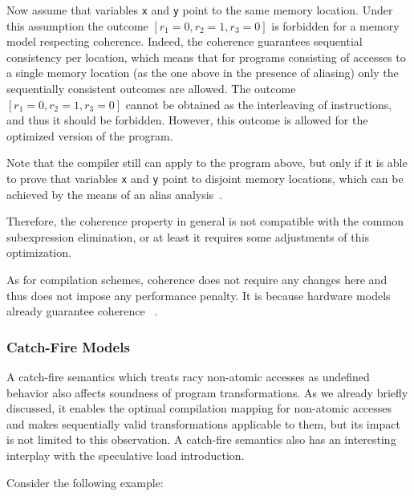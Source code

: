 Now assume that variables \texttt{x} and \texttt{y} 
point to the same memory location.
Under this assumption the outcome $[r_1=0, r_2=1, r_3=0]$
is forbidden for a memory model respecting coherence.
Indeed, the coherence guarantees sequential consistency per location, 
which means that for programs consisting of accesses 
to a single memory location 
(as the one above in the presence of aliasing) 
only the sequentially consistent outcomes are allowed.
The outcome $[r_1=0, r_2=1, r_3=0]$ cannot be obtained 
as the interleaving of instructions, and thus 
it should be forbidden.  
However, this outcome is allowed for 
the optimized version of the program. 

Note that the compiler still can apply \CSE to the program above, 
but only if it is able to prove that variables \texttt{x} and \texttt{y} 
point to disjoint memory locations, which can be achieved 
by the means of an alias analysis~\cite{Diwan-al:PLDI1998}.  

Therefore, the coherence property in general is not compatible 
with the common subexpression elimination, or at least 
it requires some adjustments of this optimization.

As for compilation schemes, coherence does not require 
any changes here and thus does not impose any performance penalty.
It is because hardware models already guarantee coherence%
~\cite{Alglave-al:TOPLAS14, Sarkar-al:PLDI11, Sewell-al:CACM10, Lahav-al:PLDI17}. 

\subsubsection{Catch-Fire Models}
\label{sec:analysis:ub}

A catch-fire semantics which treats racy non-atomic 
accesses as undefined behavior also affects  
soundness of program transformations. 
As we already briefly discussed, it enables 
the optimal compilation mapping for non-atomic accesses and 
makes sequentially valid transformations applicable 
to them, but its impact is not limited to this observation. 
A catch-fire semantics also has an interesting interplay
with the speculative load introduction.

Consider the following example:

